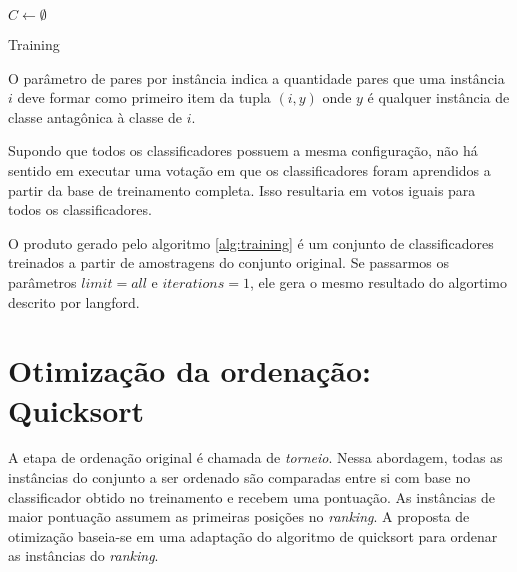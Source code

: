 \begin{algorithm}

    $C \gets \emptyset$



    \caption{Training}
    \label{alg:training}
\end{algorithm}

O parâmetro de pares por instância indica a quantidade pares que uma instância $i$ deve formar como primeiro item da tupla $(i, y)$ onde $y$ é qualquer instância de classe antagônica à classe de $i$.

Supondo que todos os classificadores possuem a mesma configuração, não há sentido em executar uma votação em que os classificadores foram aprendidos a partir da base de treinamento completa. Isso resultaria em votos iguais para todos os classificadores.

O produto gerado pelo algoritmo \ref{alg:training} é um conjunto de classificadores treinados a partir de amostragens do conjunto original. Se passarmos os parâmetros $limit=all$ e $iterations=1$, ele gera o mesmo resultado do algortimo descrito por {{langford}}.

\section{Otimização da ordenação: Quicksort}
A etapa de ordenação original é chamada de \emph{torneio}. Nessa abordagem, todas as instâncias do conjunto a ser ordenado são comparadas entre si com base no classificador obtido no treinamento e recebem uma pontuação. As instâncias de maior pontuação assumem as primeiras posições no \emph{ranking}. A proposta de otimização baseia-se em uma adaptação do algoritmo de quicksort para ordenar as instâncias do \emph{ranking}.